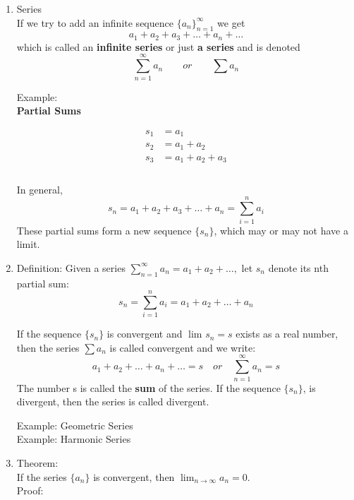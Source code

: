 \documentclass[12pt]{amsart}
\begin{document}
\begin{enumerate}
	\item Series \\
		If we try to add an infinite sequence $\{a_n\}_{n=1}^{\infty}$ we get \\
		\[
		a_1 + a_2 + a_3 + \dots + a_n + \dots
		\]
which is called an \textbf{infinite series} or just \textbf{a series} and is denoted
	\[
	\sum_{n=1}^{\infty}a_n \quad \quad or \quad \quad \sum a_n
	\]
	
	Example: \\
	
	\textbf{Partial Sums}
	
	\begin{equation} \label{eq1}
		\begin{split}
 s_1 & = a_1 \\
 s_2 & = a_1 + a_2 \\
 s_3 & = a_1 + a_2 + a_3 \\
 		\end{split}
	\end{equation} \\
In general, 
\[
s_n = a_1 + a_2 + a_3 + \dots + a_n = \sum_{i=1}^{n}a_i
\]
These partial sums form a new sequence $\{ s_n\}$, which may or may not have a limit. 

\item Definition: Given a series $\sum_{n=1}^{\infty} a_n = a_1 + a_2 + \dots ,$ let $s_n$ denote its nth partial sum:
\[
s_n = \sum_{i=1}^{n}a_i = a_1 + a_2 + \dots + a_n
\]

If the sequence $\{ s_n\}$ is convergent and $\lim_{}^{}s_n = s$ exists as a real number, then the series $\sum a_n$ is called convergent and we write: \\
\[
a_1 + a_2 + \dots + a_n + \dots = s \quad or \quad \sum_{n=1}^{\infty} a_n = s
\]
The number s is called the \textbf{sum} of the series. If the sequence $\{ s_n\}$, is divergent, then the series is called divergent. 

Example: Geometric Series \\

Example: Harmonic Series \\

\item Theorem: \\
If the series $\{ a_n\}$ is convergent, then $\lim_{n \to \infty}a_n = 0$.\\

Proof: \\ 


\end{enumerate}
\end{document}
